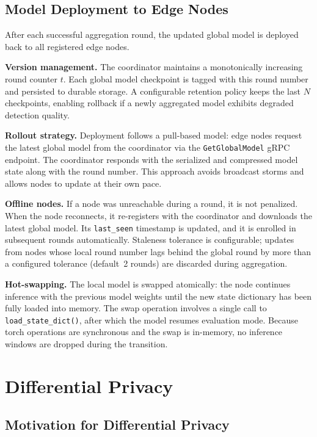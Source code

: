 \subsection{Model Deployment to Edge Nodes}
\label{subsec:fl_deployment}

After each successful aggregation round, the updated global model is deployed
back to all registered edge nodes.

\textbf{Version management.} The coordinator maintains a monotonically
increasing round counter $t$. Each global model checkpoint is tagged with this
round number and persisted to durable storage. A configurable retention policy
keeps the last $N$ checkpoints, enabling rollback if a newly aggregated model
exhibits degraded detection quality.

\textbf{Rollout strategy.} Deployment follows a pull-based model: edge nodes
request the latest global model from the coordinator via the
\texttt{GetGlobalModel} gRPC endpoint. The coordinator responds with the
serialized and compressed model state along with the round number. This
approach avoids broadcast storms and allows nodes to update at their own pace.

\textbf{Offline nodes.} If a node was unreachable during a round, it is not
penalized. When the node reconnects, it re-registers with the coordinator and
downloads the latest global model. Its \texttt{last\_seen} timestamp is updated,
and it is enrolled in subsequent rounds automatically. Staleness tolerance is
configurable; updates from nodes whose local round number lags behind the global
round by more than a configured tolerance (default~2 rounds) are discarded
during aggregation.

\textbf{Hot-swapping.} The local model is swapped atomically: the node
continues inference with the previous model weights until the new state
dictionary has been fully loaded into memory. The swap operation involves a
single call to \texttt{load\_state\_dict()}, after which the model resumes
evaluation mode. Because torch operations are synchronous and the swap is
in-memory, no inference windows are dropped during the transition.

\section{Differential Privacy}
\label{sec:differential_privacy}

\subsection{Motivation for Differential Privacy}
\label{subsec:dp_motivation}

